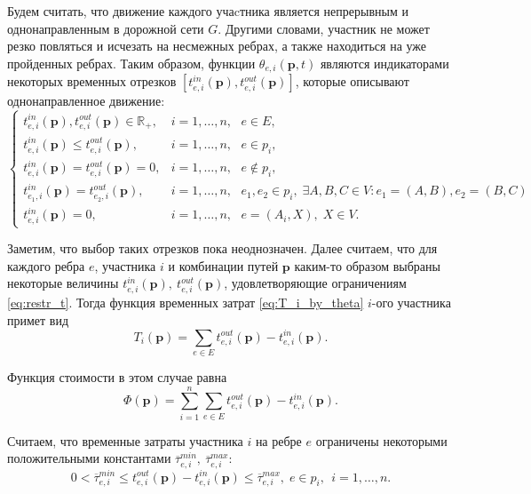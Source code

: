 \documentclass[12pt, a4paper]{article}
\begin{document}
Будем считать, что движение каждого учаcтника является непрерывным и однонаправленным в дорожной сети $G$. Другими словами, участник не может резко повляться и исчезать на несмежных ребрах, а также находиться на уже пройденных ребрах. Таким образом, функции $\theta_{e, i} (\textbf{p}, t)$ являются индикаторами некоторых временных отрезков $[t_{e, i}^{in} (\textbf{p}), t_{e, i}^{out} (\textbf{p})]$, которые описывают однонаправленное движение:
\begin{equation}
	\label{eq:restr_t}
	\begin{cases}
		t_{e, i}^{in}(\textbf{p}), t_{e, i}^{out}(\textbf{p}) \in \mathbb{R}_+,  & i = 1, \dots, n, \text{ } e \in E, \\
		t_{e, i}^{in}(\textbf{p}) \le t_{e, i}^{out}(\textbf{p}), & i = 1, \dots, n, \text{ } e \in p_i,  \\
		t_{e, i}^{in}(\textbf{p}) = t_{e, i}^{out}(\textbf{p}) = 0, & i = 1, \dots, n, \text{ } e \notin p_i, \\
		t_{e_1, i}^{in} (\textbf{p}) = t_{e_2, i}^{out} (\textbf{p}), & i = 1, \dots, n, \text{ } e_1, e_2 \in p_i, \; \exists A, B, C \in V: e_1 = (A, B), e_2 = (B, C)\\
		t_{e, i}^{in} (\textbf{p}) = 0, & i = 1, \dots, n, \text{ } e = (A_i, X), \; X \in V.
	\end{cases}
\end{equation}

Заметим, что выбор таких отрезков пока неоднозначен. Далее считаем, что для каждого ребра $e$, участника $i$ и комбинации путей $\textbf{p}$ каким-то образом выбраны некоторые величины $t_{e, i}^{in}(\textbf{p}), \: t_{e, i}^{out}(\textbf{p})$, удовлетворяющие ограничениям \eqref{eq:restr_t}. Тогда функция временных затрат \eqref{eq:T_i_by_theta} $i$-ого участника примет вид
\begin{equation}
	\label{eq:T_i_by_t}
	T_i(\textbf{p}) = \sum \limits_{e \in E} t_{e, i}^{out}(\textbf{p}) - t_{e, i}^{in}(\textbf{p}).
\end{equation}

Функция стоимости в этом случае равна 
\begin{equation}
	\label{eq:target_func}
	\Phi(\textbf{p}) =\sum \limits_{i = 1}^n \sum \limits_{e \in E} t_{e, i}^{out}(\textbf{p}) - t_{e, i}^{in}(\textbf{p}).
\end{equation}

Считаем, что временные затраты участника $i$ на ребре $e$ ограничены некоторыми положительными константами $\overline{\tau}_{e, i}^{min}, \: \overline{\tau}_{e, i}^{max}$:
\begin{equation}
	\label{eq:add_restr}
		0 < \overline{\tau}_{e, i}^{min} \le t_{e, i}^{out}(\textbf{p}) - t_{e, i}^{in}(\textbf{p}) \le \overline{\tau}_{e, i}^{max}, \; e \in p_i,\, \; i = 1, \dots, n.
\end{equation}
\end{document}
